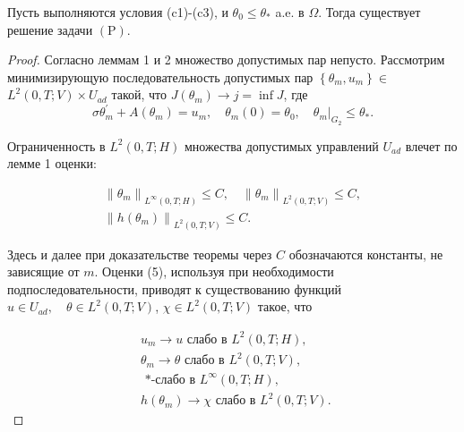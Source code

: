 \begin{theorem}
    \label{th:3_2:1}
    Пусть выполняются условия (c1)-(c3), и $\theta_{0} \leq \theta_{*}$ a.e. в $\Omega$.
    Тогда существует решение задачи $(\mathrm{P})$.
\end{theorem}

\begin{proof}
    Согласно леммам 1 и 2 множество допустимых пар непусто.
    Рассмотрим минимизирующую последовательность допустимых
    пар $\left\{\theta_{m}, u_{m}\right\} \in$ $L^{2}(0, T ; V) \times U_{a d}$
    такой, что $J\left(\theta_{m}\right) \rightarrow j=\inf J$, где
    \begin{equation}
        \label{eq:3_2:4}
        \sigma \theta_{m}^{\prime}+A\left(\theta_{m}\right)=u_{m},
        \quad \theta_{m}(0)=\theta_{0},\left.\quad \theta_{m}\right|_{G_{2}} \leq \theta_{*}.
    \end{equation}

    Ограниченность в $L^{2}(0, T ; H)$ множества допустимых
    управлений $U_{a d}$ влечет по лемме 1 оценки:

    \begin{equation}
        \label{eq:3_2:5}
        \begin{gathered}
            \left\|\theta_{m}\right\|_{L^{\infty}(0, T ; H)} \leq C,
            \quad\left\|\theta_{m}\right\|_{L^{2}(0, T ; V)} \leq C, \\
            \left\|h\left(\theta_{m}\right)\right\|_{L^{2}(0, T ; V)} \leq C.
        \end{gathered}
    \end{equation}

    Здесь и далее при доказательстве теоремы через $C$
    обозначаются константы, не зависящие от $m$.
    Оценки (5), используя при необходимости подпоследовательности,
    приводят к существованию функций
    $u \in U_{a d}, \quad \theta \in L^{2}(0, T ; V)$, $\chi  \in L^{2}(0, T; V)$
    такое, что

    \begin{equation}
        \label{eq:3_2:6}
        \begin{aligned}
            & u_{m} \rightarrow u \text { слабо в } L^{2}(0, T ; H), \\
            & \theta_{m} \rightarrow \theta \text { слабо в }
            L^{2}(0, T ; V) \text {, } \\
            & \text { *-слабо в } L^{\infty}(0, T ; H) \text {, } \\
            & h\left(\theta_{m}\right) \rightarrow \chi
            \text { слабо в } L^{2}(0, T ; V) \text {. }
        \end{aligned}
    \end{equation}


\end{proof}
